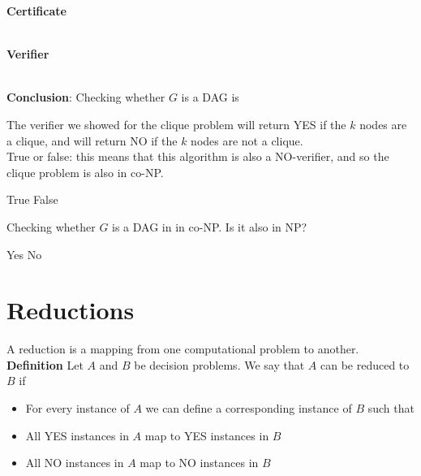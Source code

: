 \documentclass[11  pt]{article}
\begin{document}
\vs{2cm}

\textbf{Certificate} \\ \\ %

\vs{2cm}

\textbf{Verifier} \\ \\ %


\vfill

\textbf{Conclusion}: Checking whether $G$ is a DAG is   \\
\vs{1cm}

\newpage

\begin{Qu}
	The verifier we showed for the clique problem will return YES if the $k$ nodes are a clique, and will return NO if the $k$ nodes are not a clique. \\
	
	True or false: this means that this algorithm is also a NO-verifier, and so the clique problem is also in co-NP.
	\begin{itemize}
		\aitem True
		\bitem False
	\end{itemize}
	
	
\end{Qu}

\vfill

\begin{Qu}
	Checking whether $G$ is a DAG in in co-NP. Is it also in NP? 
	\begin{itemize}
		\aitem Yes
		\bitem No
	\end{itemize}
	
\end{Qu}
\vfill
\newpage
\section{Reductions}
A reduction is a mapping from one computational problem to another.  \\ 

\textbf{Definition} Let $A$ and $B$ be decision problems. We say that $A$ can be reduced to $B$ if

\begin{itemize}
	\item For every instance of $A$ we can define a corresponding instance of $B$ such that
	\item All YES instances in $A$ map to YES instances in $B$
	\item All NO instances in $A$ map to NO instances in $B$
\end{itemize}
\end{document}
